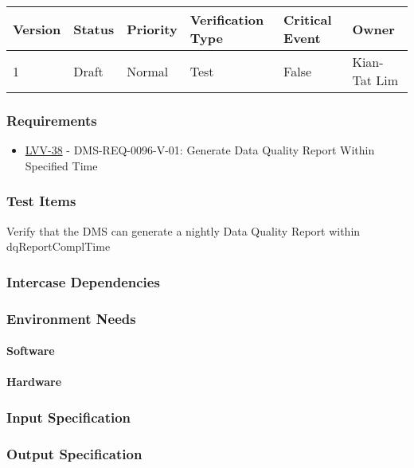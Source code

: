 \begin{longtable}[]{llllll}
\toprule
Version & Status & Priority & Verification Type & Critical Event & Owner
\\\midrule
1 & Draft & Normal &
Test & False & Kian-Tat Lim
\\\bottomrule
\end{longtable}

\subsubsection{Requirements}
\begin{itemize}
\item \href{https://jira.lsstcorp.org/browse/LVV-38}{LVV-38} - DMS-REQ-0096-V-01: Generate Data Quality Report Within Specified Time
\end{itemize}

\subsubsection{Test Items}
Verify that the DMS can generate a nightly Data Quality Report within
dqReportComplTime



\subsubsection{Intercase Dependencies}

\subsubsection{Environment Needs}

\paragraph{Software}

\paragraph{Hardware}

\subsubsection{Input Specification}

\subsubsection{Output Specification}

